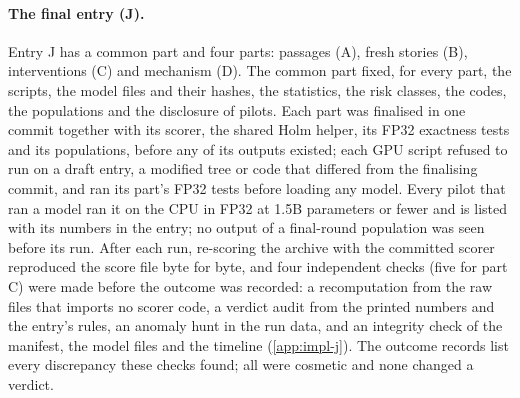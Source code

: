 \paragraph{The final entry (J).} Entry J has a common part and four parts: passages (A), fresh stories (B), interventions (C) and mechanism (D). The common part fixed, for every part, the scripts, the model files and their hashes, the statistics, the risk classes, the codes, the populations and the disclosure of pilots. Each part was finalised in one commit together with its scorer, the shared Holm helper, its FP32 exactness tests and its populations, before any of its outputs existed; each GPU script refused to run on a draft entry, a modified tree or code that differed from the finalising commit, and ran its part's FP32 tests before loading any model. Every pilot that ran a model ran it on the CPU in FP32 at 1.5B parameters or fewer and is listed with its numbers in the entry; no output of a final-round population was seen before its run. After each run, re-scoring the archive with the committed scorer reproduced the score file byte for byte, and four independent checks (five for part C) were made before the outcome was recorded: a recomputation from the raw files that imports no scorer code, a verdict audit from the printed numbers and the entry's rules, an anomaly hunt in the run data, and an integrity check of the manifest, the model files and the timeline (\cref{app:impl-j}). The outcome records list every discrepancy these checks found; all were cosmetic and none changed a verdict. %

